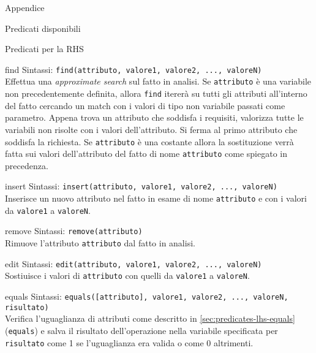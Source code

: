 \begin{chapter}{Appendice}
\begin{section}{Predicati disponibili}
\begin{subsection}{Predicati per la RHS}
		\begin{subsubsection}{find}
		\label{sec:predicates-rhs-find}
		Sintassi: \verb!find(attributo, valore1, valore2, ..., valoreN)!\\
		Effettua una \textit{approximate search} sul fatto in analisi. Se \verb,attributo, \`e
		una variabile non precedentemente definita, allora \verb,find, iterer\`a su tutti
		gli attributi all'interno del fatto cercando un match con i valori di tipo non
		variabile passati come parametro. Appena trova un attributo che soddisfa i requisiti,
		valorizza tutte le variabili non risolte con i valori dell'attributo. Si ferma al
		primo attributo che soddisfa la richiesta.
		\noindent Se \verb,attributo, \`e una costante allora la sostituzione verr\`a fatta
		sui valori dell'attributo del fatto di nome \verb,attributo, come spiegato in
		precedenza.
		\end{subsubsection}

		\begin{subsubsection}{insert}
		\label{sec:predicates-rhs-insert}
		Sintassi: \verb!insert(attributo, valore1, valore2, ..., valoreN)!\\
		Inserisce un nuovo attributo nel fatto in esame di nome \verb,attributo, e con i
		valori da \verb,valore1, a \verb,valoreN,.
		\end{subsubsection}

		\begin{subsubsection}{remove}
		\label{sec:predicates-rhs-remove}
		Sintassi: \verb!remove(attributo)!\\
		Rimuove l'attributo \verb,attributo, dal fatto in analisi.
		\end{subsubsection}

		\begin{subsubsection}{edit}
		\label{sec:predicates-rhs-edit}
		Sintassi: \verb!edit(attributo, valore1, valore2, ..., valoreN)!\\
		Sostiuisce i valori di \verb,attributo, con quelli da \verb,valore1, a \verb,valoreN,.
		\end{subsubsection}

		\begin{subsubsection}{equals}
		\label{sec:predicates-rhs-equals}
		Sintassi: \verb!equals([attributo], valore1, valore2, ..., valoreN, risultato)!\\
		Verifica l'uguaglianza di attributi come descritto in \ref{sec:predicates-lhs-equals}
		(\verb,equals,) e salva il risultato dell'operazione nella variabile specificata per
		\verb,risultato, come 1 se l'uguaglianza era valida o come 0 altrimenti.
		\end{subsubsection}


\end{subsection}
\end{section}
\end{chapter}

